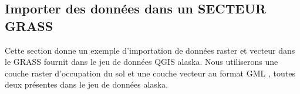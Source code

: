 \subsection{Importer des donn\'ees dans un SECTEUR GRASS}\label{sec:import_loc_data}
Cette section donne un exemple d'importation de donn\'ees raster et vecteur dans le  GRASS  fournit dans le jeu de donn\'ees QGIS alaska. Nous utiliserons une couche raster d'occupation du sol  et une couche vecteur au format GML , toutes deux pr\'esentes dans le jeu de donn\'ees alaska.
